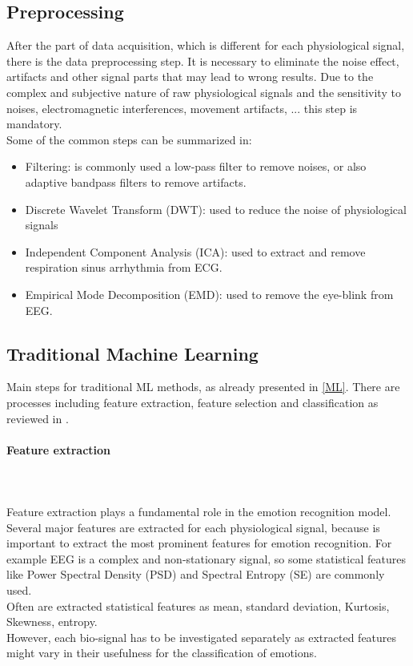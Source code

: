 \subsection{Preprocessing}
After the part of data acquisition, which is different for each physiological signal, there is the data preprocessing step. It is necessary to eliminate the noise effect, artifacts and other signal parts that may lead to wrong results. Due to the complex and subjective nature of raw physiological signals and the sensitivity to noises, electromagnetic interferences, movement artifacts, ... this step is mandatory.
\\ \indent
Some of the common steps can be summarized in:
\begin{itemize}
	\item Filtering: is commonly used a low-pass filter to remove noises, or also adaptive bandpass filters to remove artifacts.
	\item Discrete Wavelet Transform (DWT): used to reduce the noise of physiological signals
	\item Independent Component Analysis (ICA): used to extract and remove respiration sinus arrhythmia from ECG.
	\item Empirical Mode Decomposition (EMD): used to remove the eye-blink from EEG.
\end{itemize}

\subsection{Traditional Machine Learning}
Main steps for traditional ML methods, as already presented in \ref{ML}. There are processes including feature extraction, feature selection and classification as reviewed in \cite{jerritta2011physiological}.

\paragraph{Feature extraction}
\mbox{} \\ \\ \indent
Feature extraction plays a fundamental role in the emotion recognition model. Several major features are extracted for each physiological signal, because is important to extract the most prominent features for emotion recognition. For example EEG is a complex and non-stationary signal, so some statistical features like Power Spectral Density (PSD) and Spectral Entropy (SE) are commonly used.
\\
Often are extracted statistical features as mean, standard deviation, Kurtosis, Skewness, entropy.
\\
However, each bio-signal has to be investigated separately as extracted features might vary in their usefulness for the classification of emotions.

